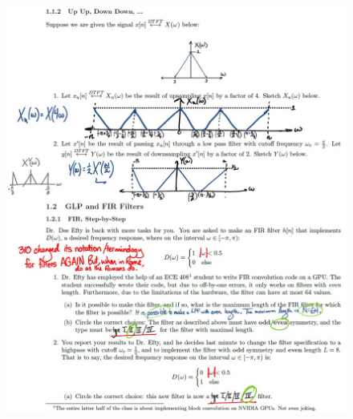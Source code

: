 \documentclass{article}
\begin{document}
\begin{figure}[h!]
\begin{center}
    \includegraphics[width= \textwidth]{figures/Solutions pg 2.jpg}
    \label{fig:old_solutions_2}
\end{center}
\end{figure}

\newpage
\end{document}
